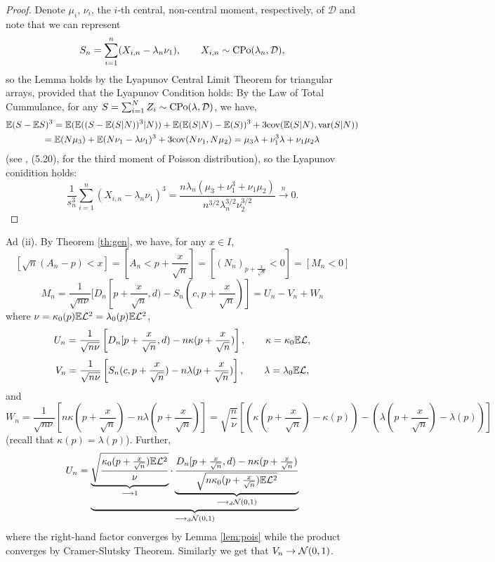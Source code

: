 \documentclass{aptpub}
\begin{document}
\begin{proof} Denote $\mu_i$, $\nu_i$, the $i$-th central, non-central moment, respectively, of $\mathcal{D}$ and note that we can represent 
$$
S_n = \sum_{i=1}^n (X_{i,n}-\lambda_n\nu_1),\qquad X_{i,n} \sim \mathcal{\mathrm{CPo}}(\lambda_n,\mathcal{D}),
$$
so the Lemma holds by the Lyapunov Central Limit Theorem for triangular arrays,
 provided that the Lyapunov Condition holds: By the Law of Total Cummulance, for any $S
=\sum_{i=1}^N Z_i \sim \mathrm{CPo}(\lambda,\mathcal{D})$, we have, 
\begin{multline*}
\mathbb{E} (S-\mathbb{E} S)^3= \mathbb{E}(\mathbb{E}((S-\mathbb{E}(S|N))^3|N)) + \mathbb{E}(\mathbb{E}(S|N)-\mathbb{E}(S))^3+3\mathrm{cov}(\mathbb{E}(S|N),\mathrm{var}(S|N))
\\=\mathbb{E}(N \mu_3)+\mathbb{E}(N \nu_1 - \lambda \nu_1 )^3+3\mathrm{cov}(N\nu_1,N\mu_2)
= \mu_3 \lambda + \nu^3_1 \lambda + \nu_1 \mu_2 \lambda
\end{multline*}
(see \cite{kendall1948advanced}, (5.20), for the third moment of Poisson distribution), so the Lyapunov conidition holds:
$$
\frac{1}{s^3_n} \sum_{i=1}^n (X_{i,n}-\lambda_n\nu_1)^3=\frac{n\lambda_n (\mu_3+\nu_1^3+\nu_1\mu_2)}{n^{3/2}\lambda^{3/2}_n \nu_2^{3/2}}\stackrel{n}\longrightarrow 0.
$$

\end{proof}

 Ad
(ii). By Theorem \ref{th:gen}, we have, for any $x\in I$, 
$$
[\sqrt{n}(A_n - p) < x] = [A_n < p + \frac x{\sqrt{n}}] = [ (N_n)_{p+\frac{x}{\sqrt n}} < 0]= [M_n < 0]
$$
$$
M_n
=\frac{1}{\sqrt{n\nu}}[D_n[p+\frac{x}{\sqrt{n}},d)-S_n(c,p+\frac{x}{\sqrt{n}})]
=U_n - V_n + W_n
$$
where $\nu=\kappa_0(p) \mathbb{E} \mathcal{L}^2=\lambda_0(p) \mathbb{E} \mathcal{L}^2$,
$$
U_n =\frac{1}{\sqrt{n\nu}}\left[D_n[p+\frac{x}{\sqrt{n}},d)-n \kappa(p+\frac{x}{\sqrt{n}})\right]
,\qquad
\kappa=\kappa_0 \mathbb{E} \mathcal{L},
$$
$$
V_n =\frac{1}{\sqrt{n\nu}}\left[S_n(c,p+\frac{x}{\sqrt{n}})-n \lambda(p+\frac{x}{\sqrt{n}})\right],
\qquad \lambda = \lambda_0\mathbb{E}\mathcal{L},
$$
and
$$
W_n =\frac{1}{\sqrt{n\nu}}\left[n\kappa(p+\frac{x}{\sqrt{n}})-n\lambda(p+\frac{x}{\sqrt{n}})\right]
={\sqrt{\frac n\nu}}\left[
(\kappa(p+\frac{x}{\sqrt{n}})-\kappa(p))-(\lambda(p+\frac{x}{\sqrt{n}})-\lambda(p))
\right]
$$
(recall that $\kappa(p)=\lambda(p)$). Further,
$$
U_n =\underbrace{\underbrace{\sqrt{\frac{\kappa_0(p+\frac{x}{\sqrt{n}}) \mathbb{E} \mathcal{L}^2}\nu}}
_{\longrightarrow 1} 
\cdot \underbrace{\frac{D_n[p+\frac{x}{\sqrt{n}},d)-n \kappa(p+\frac{x}{\sqrt{n}})}{\sqrt{n\kappa_0(p+\frac{x}{\sqrt{n}}) \mathbb{E} \mathcal{L}^2}}}_{\longrightarrow_d \mathcal{N}(0,1)}}_{\longrightarrow_d \mathcal{N}(0,1)}
$$
where the right-hand factor converges by Lemma \ref{lem:pois} while the product converges by Cramer-Slutsky Theorem. Similarly we get that 
$
V_n \rightarrow \mathcal{N}(0,1)
$.
\end{document}
